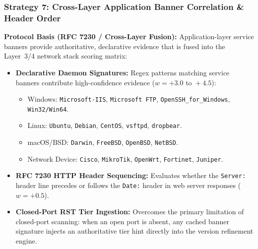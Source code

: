 \subsubsection{Strategy 7: Cross-Layer Application Banner Correlation \& Header Order }
\textbf{Protocol Basis (RFC 7230 / Cross-Layer Fusion):} Application-layer service banners provide
authoritative, declarative evidence that is fused into the Layer~3/4 network stack scoring matrix:
\begin{itemize}
    \item \textbf{Declarative Daemon Signatures:} Regex patterns matching service banners contribute high-confidence evidence ($w = +3.0 \text{ to } +4.5$):
    \begin{itemize}
        \item Windows: \texttt{Microsoft-IIS}, \texttt{Microsoft FTP}, \texttt{OpenSSH\_for\_Windows}, \texttt{Win32/Win64}.
        \item Linux: \texttt{Ubuntu}, \texttt{Debian}, \texttt{CentOS}, \texttt{vsftpd}, \texttt{dropbear}.
        \item macOS/BSD: \texttt{Darwin}, \texttt{FreeBSD}, \texttt{OpenBSD}, \texttt{NetBSD}.
        \item Network Device: \texttt{Cisco}, \texttt{MikroTik}, \texttt{OpenWrt}, \texttt{Fortinet}, \texttt{Juniper}.
    \end{itemize}
    \item \textbf{RFC 7230 HTTP Header Sequencing:} Evaluates whether the \texttt{Server:} header line
    precedes or follows the \texttt{Date:} header in web server responses ($w = +0.5$).
    \item \textbf{Closed-Port RST Tier Ingestion:} Overcomes the primary limitation of closed-port scanning:
    when an open port is absent, any cached banner signature injects an authoritative tier hint directly
    into the version refinement engine.
\end{itemize}

